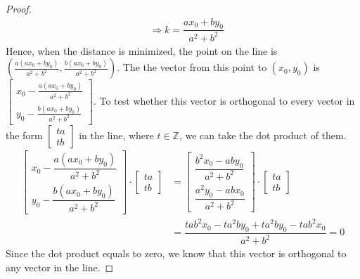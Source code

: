\begin{answer}
\begin{proof}
\begin{align}
        & \Rightarrow k = \dfrac{ax_0 + by_0}{a^2 + b^2}
    \end{align}
    Hence, when the distance is minimized, the point on the line is $(\tfrac{a(ax_0 + by_0)}{a^2 + b^2}, \tfrac{b(ax_0 + by_0)}{a^2 + b^2})$. The the vector from this point to $(x_0,y_0)$ is $\left[\begin{smallmatrix} x_0 - \tfrac{a(ax_0 + by_0)}{a^2 + b^2} \\ y_0 - \tfrac{b(ax_0 + by_0)}{a^2 + b^2} \end{smallmatrix} \right]$. To test whether this vector is orthogonal to every vector in the form $\left[\begin{smallmatrix} ta \\ tb \end{smallmatrix} \right]$ in the line, where $t \in \mathbb{Z}$, we can take the dot product of them.
    \begin{equation}
        \begin{split}
            \left[
        \begin{matrix}
            x_0 - \dfrac{a(ax_0 + by_0)}{a^2 + b^2}\\
            y_0 - \dfrac{b(ax_0 + by_0)}{a^2 + b^2}
        \end{matrix}
        \right] \cdot
        \left[
        \begin{matrix}
            ta\\
            tb
        \end{matrix}
        \right]
        & = 
        \left[
        \begin{matrix}
            \dfrac{b^2x_0 - aby_0}{a^2 + b^2}\\
            \dfrac{a^2y_0 - abx_0}{a^2 + b^2}
        \end{matrix}
        \right] \cdot
        \left[
        \begin{matrix}
            ta\\
            tb
        \end{matrix}
        \right]\\
        & = \dfrac{tab^2x_0 - ta^2by_0 + ta^2by_0 - tab^2x_0}{a^2 + b^2} = 0
        \end{split}
    \end{equation}
    Since the dot product equals to zero, we know that this vector is orthogonal to any vector in the line.
    \end{proof}
\end{answer}
